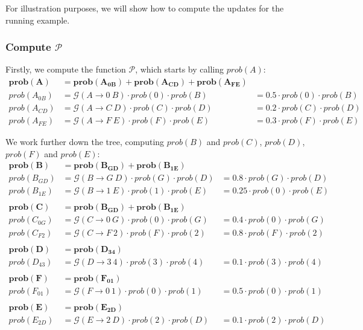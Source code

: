 \documentclass{article}
\newcommand{\G}{\mathcal{G}}
\newcommand{\Pp}{\mathcal{P}}
\begin{document}
For illustration purposes, we will show how to compute the updates for the running example.

\subsubsection{Compute $\Pp$}

Firstly, we compute the function $\Pp$, which starts by calling $prob(A)$:
\begin{align*}
\mathbf{prob(A)}&\mathbf{= prob(A_{0B}) + prob(A_{CD}) + prob(A_{FE})}\\
prob(A_{0B}) &= \G(A\rightarrow 0~B)\cdot prob(0) \cdot prob(B) &= 0.5 \cdot prob(0) \cdot prob(B)\\
prob(A_{CD}) &= \G(A\rightarrow C~D)\cdot prob(C) \cdot prob(D) &= 0.2 \cdot prob(C) \cdot prob(D)\\
prob(A_{FE}) &= \G(A\rightarrow F~E)\cdot prob(F) \cdot prob(E) &= 0.3 \cdot prob(F) \cdot prob(E)
\end{align*}

\noindent We work further down the tree, computing $prob(B)$ and $prob(C)$, $prob(D)$, $prob(F)$ and $prob(E)$:
\begin{align*}
\mathbf{prob(B)}&= \mathbf{prob(B_{GD}) + prob(B_{1E})}\\
prob(B_{GD}) &= \G(B\rightarrow G~D)\cdot prob(G) \cdot prob(D) &= 0.8 \cdot prob(G) \cdot prob(D)\\
prob(B_{1E}) &= \G(B\rightarrow 1~E)\cdot prob(1) \cdot prob(E) &= 0.25 \cdot prob(0) \cdot prob(E)\\
\\
\mathbf{prob(C)}&\mathbf{= prob(B_{GD}) + prob(B_{1E})}\\
prob(C_{0G}) &= \G(C\rightarrow 0~G)\cdot prob(0) \cdot prob(G) &= 0.4 \cdot prob(0) \cdot prob(G)\\
prob(C_{F2}) &= \G(C\rightarrow F~2)\cdot prob(F) \cdot prob(2) & = 0.8 \cdot prob(F) \cdot prob(2)\\
\\
\mathbf{prob(D)}&\mathbf{= prob(D_{34})}\\
prob(D_{43}) &= \G(D\rightarrow 3~4) \cdot prob(3) \cdot prob (4) &= 0.1 \cdot prob(3) \cdot prob(4)\\
\\
\mathbf{prob(F)}&\mathbf{= prob(F_{01})}\\
prob(F_{01}) &= \G(F\rightarrow 0~1) \cdot prob(0) \cdot prob (1) &= 0.5 \cdot prob(0) \cdot prob (1) \\
\\
\mathbf{prob(E)}&\mathbf{= prob(E_{2D})}\\
prob(E_{2D}) &= \G(E\rightarrow 2~D) \cdot prob(2) \cdot prob(D) &= 0.1\cdot prob(2) \cdot prob(D)
\end{align*}
\end{document}

